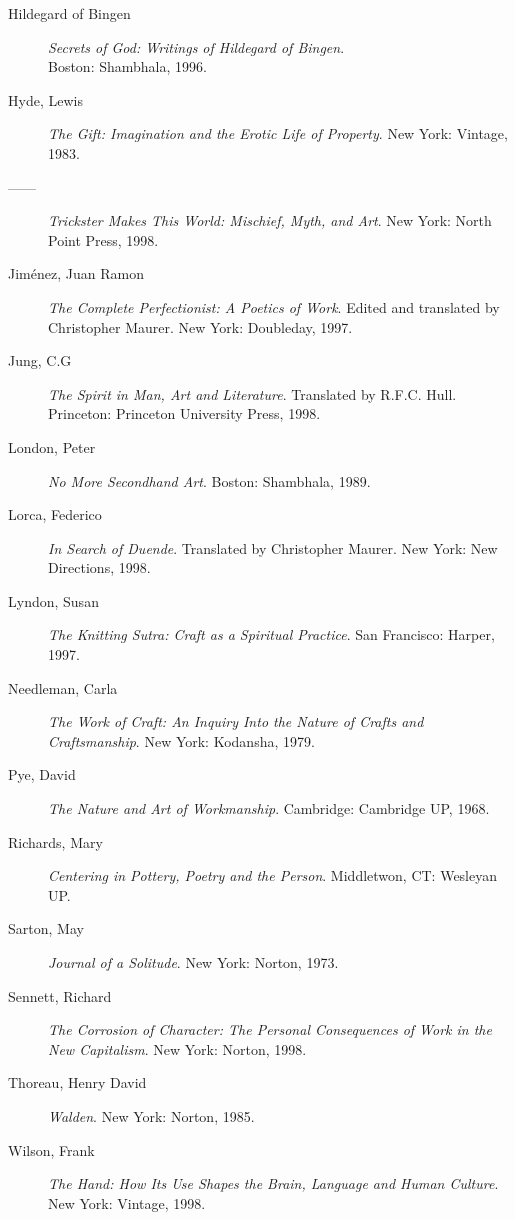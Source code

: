 \documentclass[10pt,DIV09,letterpaper,oneside,headsepline]{scrreprt}
\begin{document}
\begin{flushleft}
\begin{description}
\item [Hildegard of Bingen] \textit{Secrets of God: Writings of
Hildegard of Bingen}.\\ Boston: Shambhala, 1996.
\item [Hyde, Lewis] \textit{The Gift: Imagination and the Erotic Life
of Property}. New York: Vintage, 1983.
\item [------] \textit{Trickster Makes This World: Mischief, Myth,
and Art}. New York: North Point Press, 1998.
\item [Jim\'enez, Juan Ramon] \textit{The Complete Perfectionist: A
Poetics of Work}. Edited and translated by Christopher Maurer. New
York: Doubleday, 1997.
\item [Jung, C.G] \textit{The Spirit in Man, Art and Literature}.
Translated by R.F.C. Hull. Princeton: Princeton University Press,
1998.
\item [London, Peter] \textit{No More Secondhand Art}. Boston:
Shambhala, 1989.
\item [Lorca, Federico] \textit{In Search of Duende}. Translated by
Christopher Maurer. New York: New Directions, 1998.
\item [Lyndon, Susan] \textit{The Knitting Sutra: Craft as a Spiritual
Practice}. San Francisco: Harper, 1997.
\item [Needleman, Carla] \textit{The Work of Craft: An Inquiry Into
the Nature of Crafts and Craftsmanship}. New York: Kodansha, 1979.
\item [Pye, David] \textit{The Nature and Art of Workmanship}.
Cambridge: Cambridge UP, 1968.
\item [Richards, Mary] \textit{Centering in Pottery, Poetry and the
Person}. Middletwon, CT: Wesleyan UP.
\item [Sarton, May] \textit{Journal of a Solitude}. New York: Norton,
1973.
\item [Sennett, Richard] \textit{The Corrosion of Character: The
Personal Consequences of Work in the New Capitalism}. New York:
Norton, 1998.
\item [Thoreau, Henry David] \textit{Walden}. New York: Norton, 1985.
\item [Wilson, Frank] \textit{The Hand: How Its Use Shapes the Brain,
Language and Human Culture}. New York: Vintage, 1998.
\end{description}


\end{flushleft}
\end{document}
